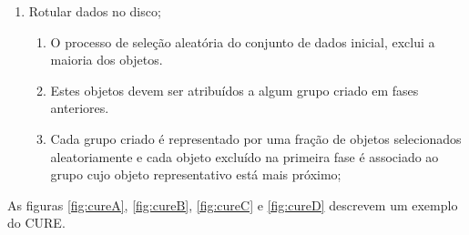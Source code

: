 \begin{enumerate}
    \item Rotular dados no disco;
        \begin{enumerate}
            \item O processo de seleção aleatória do conjunto de dados inicial, exclui a maioria dos objetos.
            \item Estes objetos devem ser atribuídos a algum grupo criado em fases anteriores.
            \item Cada grupo criado é representado por uma fração de objetos selecionados aleatoriamente e cada objeto excluído na primeira fase é associado ao grupo cujo objeto representativo está mais próximo;
        \end{enumerate}
\end{enumerate}

As figuras \ref{fig:cureA}, \ref{fig:cureB}, \ref{fig:cureC} e \ref{fig:cureD} descrevem um exemplo do CURE.
\begin{figure}[!ht]
	\centering
\end{figure}
\begin{figure}[!ht]
	\centering
\end{figure}
